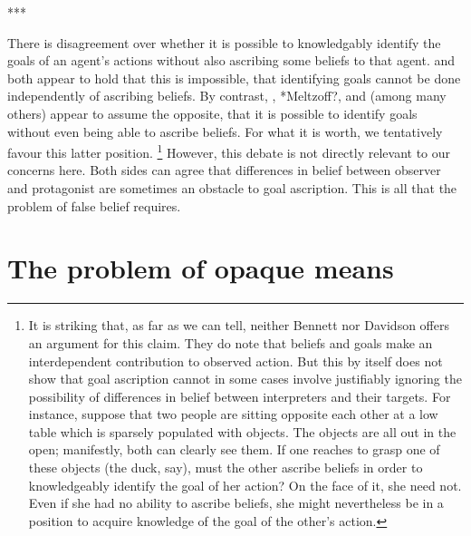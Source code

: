 \documentclass[14pt,a4paper]{extarticle}
\begin{document}
***

There is disagreement over whether it is possible to knowledgably identify the goals of an agent's actions without also ascribing some beliefs to that agent.  
\citet[pp.48--50]{Bennett:1976rg}
and 
\citet{Davidson:1974gh}
both appear to hold that this is impossible,
that identifying goals cannot be done independently of ascribing beliefs.
By contrast,
\citet{Gergely:1995sq},
*Meltzoff?,
\citet{Baillargeon:gx}
and 
\citet{Woodward:1998dm}
(among many others)
appear to assume the opposite, 
that it is possible to identify goals without even being able to ascribe beliefs.
For what it is worth, we tentatively favour this latter position.%
\footnote{
It is striking that, as far as we can tell, neither Bennett nor Davidson offers an argument for this claim.
They do note that beliefs and goals make an interdependent contribution to observed action.
But this by itself does not show that goal ascription cannot in some cases involve justifiably ignoring the possibility of differences in belief between interpreters and their targets.
For instance,
suppose that two people are sitting opposite each other at a low table
 which is 
sparsely populated with objects.
The objects are all out in the open; manifestly, both can clearly see them.
If one reaches to grasp one of these objects (the duck, say), 
must the other ascribe beliefs in order to knowledgeably identify the goal of her action?
On the face of it, she need not.  
Even if she had no ability to ascribe beliefs, she might nevertheless be in a position to acquire knowledge of the goal of the other's action.
}
However, this debate is not directly relevant to our concerns here.
Both sides can agree that 
differences in belief between observer and protagonist
are sometimes an obstacle to goal ascription.
This is all that the problem of false belief requires.




\section{The problem of opaque means}
\label{sec:opaque_means}
\end{document}
